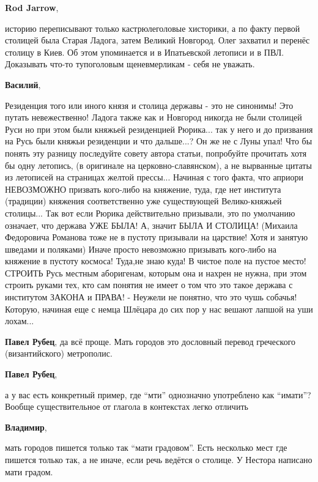 \begin{itemize}
\begin{itemize}
\textbf{Rod Jarrow}, 

историю переписывают только кастрюлеголовые хисторики, а по факту первой
столицей была Старая Ладога, затем Великий Новгород. Олег захватил и перенёс
столицу в Киев. Об этом упоминается и в Ипатьевской летописи и в ПВЛ.
Доказывать что-то тупоголовым щеневмерликам - себя не уважать.

\textbf{Василий}, 

Резиденция того или иного князя и столица державы - это не синонимы! Это путать
невежественно! Ладога также как и Новгород никогда не были столицей Руси но при
этом были княжьей резиденцией Рюрика... так у него и до призвания на Русь были
княжьи резиденции и что дальше...? Он же не с Луны упал! Что бы понять эту
разницу последуйте совету автора статьи, попробуйте прочитать хотя бы одну
летопись, (в оригинале на церковно-славянском), а не вырванные цитаты из
летописей на страницах желтой прессы... Начиная с того факта, что априори
НЕВОЗМОЖНО призвать кого-либо на княжение, туда, где нет института (традиции)
княжения соответственно уже существующей Велико-княжьей столицы... Так вот если
Рюрика действительно призывали, это по умолчанию означает, что держава УЖЕ
БЫЛА! А, значит БЫЛА И СТОЛИЦА! (Михаила Федоровича Романова тоже не в пустоту
призывали на царствие! Хотя и занятую шведами и поляками) Иначе просто
невозможно призывать кого-либо на княжение в пустоту космоса! Туда,не знаю
куда! В чистое поле на пустое место! СТРОИТЬ Русь местным аборигенам, которым
она и нахрен не нужна, при этом строить руками тех, кто сам понятия не имеет о
том что это такое держава с институтом ЗАКОНА и ПРАВА! - Неужели не понятно,
что это чушь собачья! Которую, начиная еще с немца Шлёцара до сих пор у нас
вешают лапшой на уши лохам...

\textbf{Павел Рубец}, да всё проще. Мать городов это дословный перевод греческого (византийского) метрополис.

\textbf{Павел Рубец}, 

а у вас есть конкретный пример, где \enquote{мти} однозначно употреблено как \enquote{имати}?
Вообще существительное от глагола в контекстах легко отличить

\textbf{Владимир}, 

мать городов пишется только так \enquote{мати градовом}. Есть несколько мест где
пишется только так, а не иначе, если речь ведётся о столице. У Нестора написано
мати градом.


\end{itemize}
\end{itemize}
